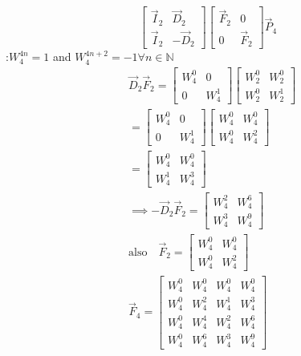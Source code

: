 \documentclass[journal,12pt,twocolumn]{IEEEtran}
\renewcommand\thesection{\arabic{section}}
\begin{document}
\begin{enumerate}[label=\arabic*.,ref=\thesection.\theenumi]
\begin{equation}
\begin{bmatrix}
	\vec{I}_{2} & \vec{D}_{2} \\
\vec{I}_{2} & -\vec{D}_{2}
\end{bmatrix}
\begin{bmatrix}
\vec{F}_{2} & 0 \\
0 & \vec{F}_{2}
\end{bmatrix}
\vec{P}_{4}
\end{equation}
\solution:$W_4^{4n} = 1$ and $W_4^{4n + 2} = -1 \forall n \in \mathbb{N}$ 
\begin{align}
&\vec{D}_{2} \vec{F}_{2}=\begin{bmatrix}
W_{4}^0 & 0\\
0 & W_{4}^1
\end{bmatrix}
\begin{bmatrix}
W_{2}^0 & W_{2}^0\\
W_{2}^0 & W_{2}^1
\end{bmatrix}\\
&=\begin{bmatrix}
W_{4}^0 & 0\\
0 & W_{4}^1
\end{bmatrix}
\begin{bmatrix}
W_{4}^0 & W_{4}^0\\
W_{4}^0 & W_{4}^2
\end{bmatrix}
\\
&=\begin{bmatrix}
W_{4}^0 & W_{4}^0\\
W_{4}^1 & W_{4}^3
\end{bmatrix}
\\
&\implies -\vec{D}_{2} \vec{F}_{2}=\begin{bmatrix}
W_{4}^2 & W_{4}^6\\
W_{4}^3 & W_{4}^9
\end{bmatrix}
\\
&\text{also} \quad \vec{F}_{2}=\begin{bmatrix}
W_{4}^0 & W_{4}^0\\
W_{4}^0 & W_{4}^2
\end{bmatrix}
\\
&\vec{F}_4=\begin{bmatrix}
W_{4}^{0} & W_{4}^{0} & W_{4}^{0} & W_{4}^{0} \\
W_{4}^{0} & W_{4}^{2} & W_{4}^{1} & W_{4}^{3} \\
W_{4}^{0} & W_{4}^{4} & W_{4}^{2} & W_{4}^{6} \\
W_{4}^{0} & W_{4}^{6} & W_{4}^{3} & W_{4}^{9} 
\end{bmatrix}
\\

\end{align}
\end{enumerate}
\end{document}
